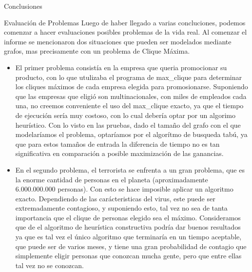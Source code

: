 \documentclass[12pt,titlepage]{article}
\newcommand{\tab}{\hspace*{2em}}
\begin{document}
\begin{section}{Conclusiones}
\begin{itemize}
		\begin{subsection}{Evaluación de Problemas}
		\tab Luego de haber llegado a varias concluciones, podemos comenzar a hacer evaluaciones posibles problemas de la vida real. Al comenzar el informe se mencionaron dos situaciones que pueden ser modelados mediante grafos, mas precisamente con un problema de Clique Máxima. 
		\begin{itemize}
		\item El primer problema consistía en la empresa que queria promocionar su producto, con lo que utulizaba el programa de max\_clique para determinar los cliques máximos de cada empresa elegida para promosionarse. Suponiendo que las empresas que eligió son multinacionales, con miles de empleados cada una, no creemos conveniente el uso del max\_clique exacto, ya que el tiempo de ejecución sería muy costoso, con lo cual debería optar por un algorimo heurístico. Con lo visto en las pruebas, dado el tamaño del grafo con el que modelaríamos el problema, optaríamos por el algorítmo de busqueda tabú, ya que para estos tamaños de entrada la diferencia de tiempo no es tan significativa en comparación a posible maximización de las ganancias.
		\item En el segundo problema, el terrorista se enfrenta a un gran problema, que es la enorme cantidad de personas en el planeta (aproximadamente 6.000.000.000 personas). Con esto se hace imposible aplicar un algoritmo exacto. Dependiendo de las carácteristicas del virus, este puede ser extremadamente contagioso, y suponiendo esto, tal vez no sea de tanta importancia que el clique de personas elegido sea el máximo. Consideramos que de el algoritmo de heurística constructiva podría dar buenos resultados ya que es tal vez el único algoritmo que terminaría en un tiempo aceptable, que puede ser de varios meses, y tiene una gran probabilidad de contagio que simplemente eligir personas que conozcan mucha gente, pero que entre ellas tal vez no se conozcan.
		\end{itemize}
	\end{subsection}
	\end{itemize}	
	\end{section}
	
\end{document}
